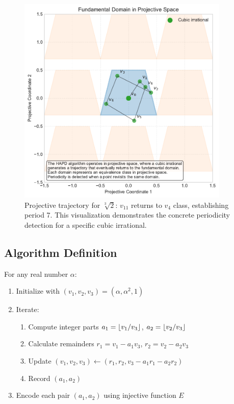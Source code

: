 \begin{theorem}
\begin{figure}[htbp]
\centering
\includegraphics[width=0.9\textwidth]{figures/projective_space_regions.pdf}
\caption{Projective trajectory for $\sqrt[3]{2}$: $v_{11}$ returns to $v_4$ class, establishing period 7. This visualization demonstrates the concrete periodicity detection for a specific cubic irrational.}
\label{fig:projective_trajectory}
\end{figure}

\subsection{Algorithm Definition}

\begin{algorithm_def}\label{alg:hapd_detailed}
For any real number $\alpha$:
\begin{enumerate}
    \item Initialize with $(v_1, v_2, v_3) = (\alpha, \alpha^2, 1)$
    \item Iterate:
    \begin{enumerate}
        \item Compute integer parts $a_1 = \lfloor v_1/v_3 \rfloor$, $a_2 = \lfloor v_2/v_3 \rfloor$
        \item Calculate remainders $r_1 = v_1 - a_1v_3$, $r_2 = v_2 - a_2v_3$
        \item Update $(v_1, v_2, v_3) \leftarrow (r_1, r_2, v_3 - a_1r_1 - a_2r_2)$
        \item Record $(a_1, a_2)$
    \end{enumerate}
    \item Encode each pair $(a_1, a_2)$ using injective function $E$
\end{enumerate}
\end{algorithm_def}


\end{theorem}
